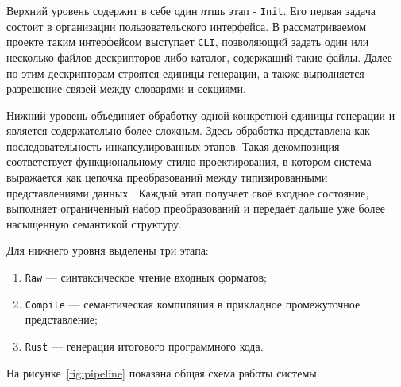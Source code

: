 \documentclass[a4paper,12pt]{article}
\begin{document}
Верхний уровень содержит в себе один лтшь этап - \texttt{Init}.
Его первая задача состоит в организации пользовательского интерфейса.
В рассматриваемом проекте таким интерфейсом выступает \texttt{CLI}, позволяющий задать
один или несколько файлов-дескрипторов либо каталог, содержащий такие файлы. Далее по
этим дескрипторам строятся единицы генерации, а также выполняется разрешение связей
между словарями и секциями.

Нижний уровень объединяет обработку одной конкретной единицы генерации и является
содержательно более сложным. Здесь обработка представлена как последовательность
инкапсулированных этапов. Такая декомпозиция соответствует
функциональному стилю проектирования, в котором система выражается как цепочка
преобразований между типизированными представлениями данных
\cite{rwh_2008,granin_fda_2024}. Каждый этап получает своё входное состояние,
выполняет ограниченный набор преобразований и передаёт дальше уже более насыщенную
семантикой структуру.

Для нижнего уровня выделены три этапа:
\begin{enumerate}
  \item \texttt{Raw} --- синтаксическое чтение входных форматов;
  \item \texttt{Compile} --- семантическая компиляция в прикладное промежуточное представление;
  \item \texttt{Rust} --- генерация итогового программного кода.
\end{enumerate}

На рисунке~\ref{fig:pipeline} показана общая схема работы системы.
\end{document}
